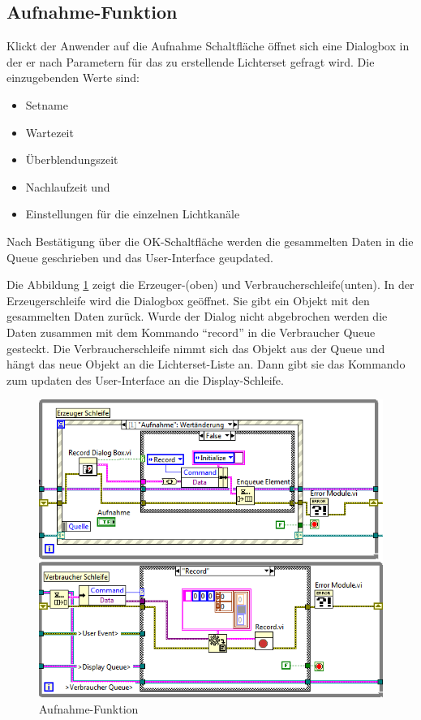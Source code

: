 \subsection{Aufnahme-Funktion}	
Klickt der Anwender auf die Aufnahme Schaltfläche öffnet sich eine Dialogbox in der er nach Parametern für das zu erstellende Lichterset gefragt wird. Die einzugebenden Werte sind:
\begin{itemize}
\item Setname
\item Wartezeit
\item Überblendungszeit
\item Nachlaufzeit und
\item Einstellungen für die einzelnen Lichtkanäle
\end{itemize}

Nach Bestätigung über die OK-Schaltfläche werden die gesammelten Daten in die Queue geschrieben und das User-Interface geupdated. 

Die Abbildung \ref{fig:rec} zeigt die Erzeuger-(oben) und Verbraucherschleife(unten). In der Erzeugerschleife wird die Dialogbox geöffnet. Sie gibt ein Objekt mit den gesammelten Daten zurück. Wurde der Dialog nicht abgebrochen werden die Daten zusammen mit dem Kommando "`record"' in die Verbraucher Queue gesteckt. Die Verbraucherschleife nimmt sich das Objekt aus der Queue und hängt das neue Objekt an die Lichterset-Liste an. Dann gibt sie das Kommando zum updaten des User-Interface an die Display-Schleife.

	\begin{figure}[h!]
	\centering
		\includegraphics[width=\textwidth]{Pics/record.png}
	\caption{Aufnahme-Funktion}
	\label{fig:rec}
	\end{figure}
	
